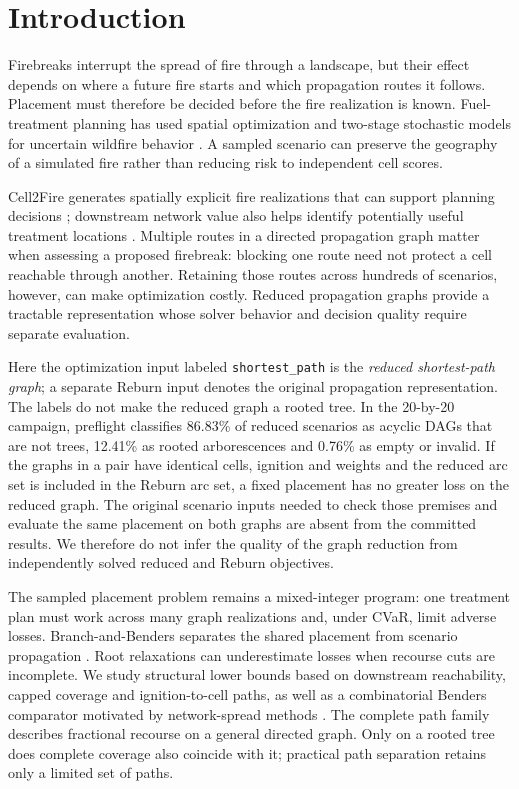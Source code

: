 \section{Introduction}\label{sec:introduction}

Firebreaks interrupt the spread of fire through a landscape, but their
effect depends on where a future fire starts and which propagation
routes it follows. Placement must therefore be decided before the fire
realization is known. Fuel-treatment planning has used spatial
optimization and two-stage stochastic models for uncertain wildfire
behavior \citep{agee2000use,kabli2015stochastic}. A sampled scenario
can preserve the geography of a simulated fire rather than reducing
risk to independent cell scores.

Cell2Fire generates spatially explicit fire realizations that can
support planning decisions \citep{pais2021cell2fire}; downstream network
value also helps identify potentially useful treatment locations
\citep{pais2021downstream}. Multiple routes in a directed propagation
graph matter when assessing a proposed firebreak: blocking one route
need not protect a cell reachable through another. Retaining those
routes across hundreds of scenarios, however, can make optimization
costly. Reduced propagation graphs provide a tractable representation
whose solver behavior and decision quality require separate evaluation.

Here the optimization input labeled \texttt{shortest\_path} is the
\emph{reduced shortest-path graph}; a separate Reburn input denotes the
original propagation representation. The labels do
not make the reduced graph a rooted tree. In the 20-by-20 campaign,
preflight classifies 86.83\% of reduced scenarios as acyclic DAGs that
are not trees, 12.41\% as rooted arborescences and 0.76\% as empty or
invalid. If the graphs in a pair have identical cells, ignition and
weights and the reduced arc set is included in the Reburn arc set, a
fixed placement has no greater loss on the reduced graph. The original
scenario inputs needed to check those premises and evaluate the same
placement on both graphs are absent from the committed results. We
therefore do not infer the quality of the graph reduction from
independently solved reduced and Reburn objectives.

The sampled placement problem remains a mixed-integer program: one
treatment plan must work across many graph realizations and, under
CVaR, limit adverse losses. Branch-and-Benders separates the shared
placement from scenario propagation \citep{rahmaniani2017benders}.
Root relaxations can underestimate losses when recourse cuts are
incomplete. We study structural lower bounds based on downstream
reachability, capped coverage and ignition-to-cell paths, as well as a
combinatorial Benders comparator motivated by network-spread methods
\citep{taninmics2024benders}. The complete path family describes
fractional recourse on a general directed graph. Only on a rooted tree
does complete coverage also coincide with it; practical path
separation retains only a limited set of paths.

